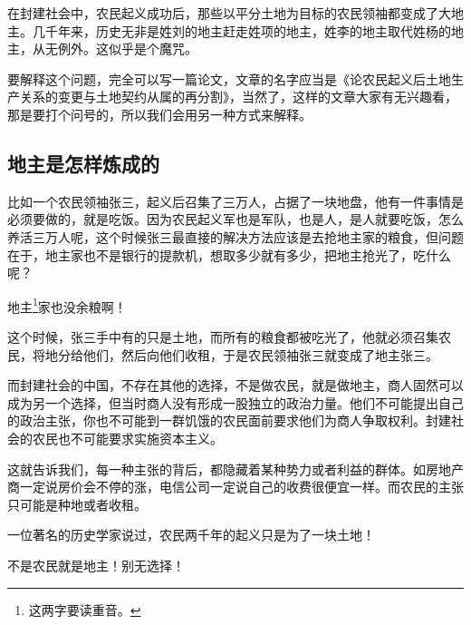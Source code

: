 \begin{multicols}{\theparacolNo}
		在封建社会中，农民起义成功后，那些以平分土地为目标的农民领袖都变成了大地主。几千年来，历史无非是姓刘的地主赶走姓项的地主，姓李的地主取代姓杨的地主，从无例外。这似乎是个魔咒。

		要解释这个问题，完全可以写一篇论文，文章的名字应当是《论农民起义后土地生产关系的变更与土地契约从属的再分割》，当然了，这样的文章大家有无兴趣看，那是要打个问号的，所以我们会用另一种方式来解释。

		\subsection{地主是怎样炼成的}
		比如一个农民领袖张三，起义后召集了三万人，占据了一块地盘，他有一件事情是必须要做的，就是吃饭。因为农民起义军也是军队，也是人，是人就要吃饭，怎么养活三万人呢，这个时候张三最直接的解决方法应该是去抢地主家的粮食，但问题在于，地主家也不是银行的提款机，想取多少就有多少，把地主抢光了，吃什么呢？

		地主\footnote{这两字要读重音。}家也没余粮啊！

		这个时候，张三手中有的只是土地，而所有的粮食都被吃光了，他就必须召集农民，将地分给他们，然后向他们收租，于是农民领袖张三就变成了地主张三。

		而封建社会的中国，不存在其他的选择，不是做农民，就是做地主，商人固然可以成为另一个选择，但当时商人没有形成一股独立的政治力量。他们不可能提出自己的政治主张，你也不可能到一群饥饿的农民面前要求他们为商人争取权利。封建社会的农民也不可能要求实施资本主义。

		这就告诉我们，每一种主张的背后，都隐藏着某种势力或者利益的群体。如房地产商一定说房价会不停的涨，电信公司一定说自己的收费很便宜一样。而农民的主张只可能是种地或者收租。

		一位著名的历史学家说过，农民两千年的起义只是为了一块土地！

		不是农民就是地主！别无选择！
		\ifnum{}
	\end{multicols}
\fi
\newpage
